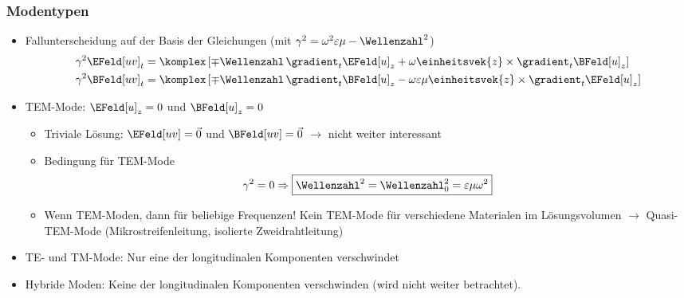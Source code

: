 \begin{frame}
  \frametitle{Modentypen}
  \begin{itemize}[<+->]
  \item \alert{Fallunterscheidung} auf der Basis der Gleichungen (mit \(\gamma^2= \omega^2\varepsilon\mu - \Wellenzahl^2\))
    \begin{align*}
      \gamma^2\EFeld[uv]_t &= \komplex \left[ \mp \Wellenzahl\, \gradient_t \EFeld[u]_{z} + \omega  \einheitsvek{z}\times\gradient_t \BFeld[u]_{z}\right]\\
      \gamma^2\BFeld[uv]_t &= \komplex \left[ \mp \Wellenzahl\, \gradient_t \BFeld[u]_{z} - \omega\varepsilon\mu  \einheitsvek{z}\times\gradient_t \EFeld[u]_{z}\right]
    \end{align*}
  \item \alert{TEM-Mode}: \(\EFeld[u]_z=0\) und \(\BFeld[u]_z=0\)
    \begin{itemize}[<+->]
    \item Triviale Lösung: \(\EFeld[uv]=\vec{0}\) und \(\BFeld[uv]=\vec{0}\) \(\to\) nicht weiter interessant
    \item \alert{Bedingung für TEM-Mode}
      \begin{equation*}
        \gamma^2=0 \Rightarrow \boxed{\Wellenzahl^2 = \Wellenzahl_0^2= \varepsilon\mu\omega^2}
      \end{equation*}
      \item Wenn TEM-Moden, dann für beliebige Frequenzen! Kein TEM-Mode für verschiedene Materialen im Lösungsvolumen \(\to\) \alert{Quasi-TEM-Mode} (Mikrostreifenleitung, isolierte Zweidrahtleitung)
      \end{itemize}
    \item \alert{TE- und TM-Mode}: Nur eine der longitudinalen Komponenten verschwindet
      \item \alert{Hybride Moden}: Keine der longitudinalen Komponenten verschwinden (wird nicht weiter betrachtet). 
    \end{itemize}
\end{frame}

